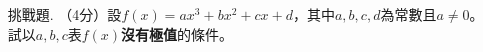 \documentclass[12pt]{article}
\begin{document}
\begin{enumerate}
        \hrulefill

        \hrulefill

        \hrulefill

        \hrulefill

        \hrulefill

        \hrulefill

        \hrulefill

        \hrulefill

        \hrulefill

        \hrulefill

        \hrulefill

        \hrulefill

        \hrulefill

        \hrulefill

        \hrulefill

        \hrulefill

        \hrulefill

        \hrulefill

        \hrulefill

        \hrulefill

        \hrulefill

        \hrulefill

        \hrulefill

        \hrulefill

        \hrulefill

        \hrulefill

        \hrulefill

        \hrulefill

        \hrulefill

        \hrulefill

        \hrulefill

        \hrulefill

        \hrulefill

        \hrulefill

        \hrulefill

        \hrulefill

        \hrulefill
        \item[挑戰題.] （4分）設$f(x)=ax^3+bx^2+cx+d$，其中$a,b,c,d$為常數且$a\neq 0$。試以$a,b,c$表$f(x)$\textbf{沒有極值}的條件。

        \hrulefill

        \hrulefill

        \hrulefill

        \hrulefill


\end{enumerate}
\end{document}

